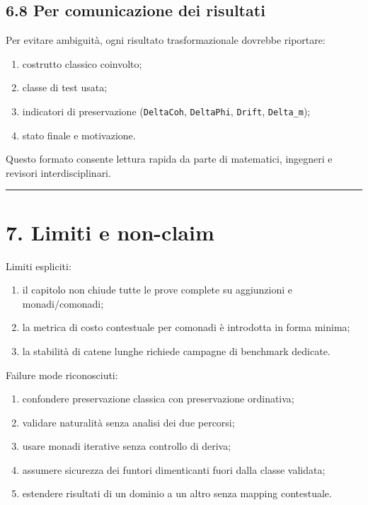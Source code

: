\subsection{6.8 Per comunicazione dei risultati}

Per evitare ambiguità, ogni risultato trasformazionale dovrebbe riportare:

\begin{enumerate}
\def\labelenumi{\arabic{enumi}.}
\tightlist
\item
  costrutto classico coinvolto;
\item
  classe di test usata;
\item
  indicatori di preservazione (\texttt{DeltaCoh}, \texttt{DeltaPhi}, \texttt{Drift}, \texttt{Delta\_m});
\item
  stato finale e motivazione.
\end{enumerate}

Questo formato consente lettura rapida da parte di matematici, ingegneri e revisori interdisciplinari.

\begin{center}\rule{0.5\linewidth}{0.5pt}\end{center}

\section{7. Limiti e non-claim}

Limiti espliciti:

\begin{enumerate}
\def\labelenumi{\arabic{enumi}.}
\tightlist
\item
  il capitolo non chiude tutte le prove complete su aggiunzioni e monadi/comonadi;
\item
  la metrica di costo contestuale per comonadi è introdotta in forma minima;
\item
  la stabilità di catene lunghe richiede campagne di benchmark dedicate.
\end{enumerate}

Failure mode riconosciuti:

\begin{enumerate}
\def\labelenumi{\arabic{enumi}.}
\tightlist
\item
  confondere preservazione classica con preservazione ordinativa;
\item
  validare naturalità senza analisi dei due percorsi;
\item
  usare monadi iterative senza controllo di deriva;
\item
  assumere sicurezza dei funtori dimenticanti fuori dalla classe validata;
\item
  estendere risultati di un dominio a un altro senza mapping contestuale.
\end{enumerate}

